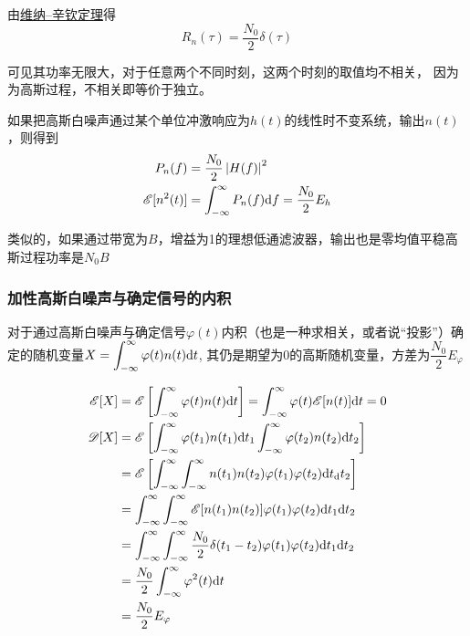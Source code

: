     由\hyperref[thm:Wiener_Khinchin]{维纳--辛钦定理}得
    \begin{equation}
        R_n(\tau)=\frac{N_0}{2}\delta(\tau)
    \end{equation}
    
    可见其功率无限大，对于任意两个不同时刻，这两个时刻的取值均不相关，
    因为为高斯过程，不相关即等价于独立。

    如果把高斯白噪声通过某个单位冲激响应为$h(t)$的线性时不变系统，输出$n(t)$，则得到
    \begin{align}
        P_n(f)&=\frac{N_0}{2}\left\vert H(f) \right\vert^2\\
        \mathscr{E}[n^2(t)]&=\int_{-\infty}^{\infty}P_n(f)\text{\upshape d} f=\frac{N_0}{2}E_h
    \end{align}

    类似的，如果通过带宽为$B$，增益为1的理想低通滤波器，输出也是零均值平稳高斯过程功率是$N_0B$

    \subsubsection{加性高斯白噪声与确定信号的内积}
    对于通过高斯白噪声与确定信号$\varphi(t)$内积（也是一种求相关，或者说“投影”）确定的随机变量$X=\displaystyle\int_{-\infty}^{\infty}\varphi(t)n(t)\text{\upshape d} t$,
    其仍是期望为0的高斯随机变量，方差为$\dfrac{N_0}{2}E_\varphi$
    
    \Proof
    \begin{equation*}
        \begin{split}
            \mathscr{E}[X] &=\mathscr{E}\left[\int_{-\infty}^{\infty}\varphi(t)n(t)\text{\upshape d} t\right]=\int_{-\infty}^{\infty}\varphi(t)\mathscr{E}[n(t)]\text{\upshape d} t=0\\
            \mathscr{D}[X] &=\mathscr{E}\left[\int_{-\infty}^{\infty}\varphi(t_1)n(t_1)\text{\upshape d} t_1\int_{-\infty}^{\infty}\varphi(t_2)n(t_2)\text{\upshape d} t_2\right]\\
                           &=\mathscr{E}\left[\int_{-\infty}^{\infty}\int_{-\infty}^{\infty}n(t_1)n(t_2)\varphi(t_1)\varphi(t_2)\text{\upshape d} t_{\text{\upshape d}} t_2\right]\\
                           &=\int_{-\infty}^{\infty}\int_{-\infty}^{\infty}\mathscr{E}[n(t_1)n(t_2)]\varphi(t_1)\varphi(t_2)\text{\upshape d} t_1\text{\upshape d} t_2\\
                           &=\int_{-\infty}^{\infty}\int_{-\infty}^{\infty}\frac{N_0}{2}\delta(t_1-t_2)\varphi(t_1)\varphi(t_2)\text{\upshape d} t_1\text{\upshape d} t_2\\
                           &=\frac{N_0}{2}\int_{-\infty}^{\infty}\varphi^2(t)\text{\upshape d} t\\
                           &=\frac{N_0}{2}E_\varphi
        \end{split}
    \end{equation*}


